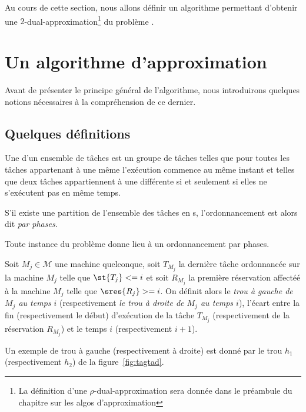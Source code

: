 \documentclass[a4paper,9pt]{article}
\begin{document}
Au cours de cette section, nous allons définir un algorithme permettant d'obtenir une
$2$-dual-approximation\footnote{La définition d'une $\rho$-dual-approximation sera donnée dans le
préambule du chapitre sur les algos d'approximation} du problème \unitfisched{}. 

\section{Un algorithme d'approximation}

Avant de présenter le principe général de l'algorithme, nous introduirons quelques notions
nécessaires à la compréhension de ce dernier.

\subsection{Quelques définitions}

\begin{ndf}
    Une \tphase{} d'un ensemble de tâches est un groupe de tâches telles que pour toutes les tâches
    appartenant à une même \tphase{} l'exécution commence au même instant et telles que deux tâches
    appartiennent à une \tphase{} différente si et seulement si elles ne s'exécutent pas en même
    temps.

    S'il existe une partition de l'ensemble des tâches en \tphase{}s, l'ordonnancement est alors dit
    \emph{par phases}.
\end{ndf}

\begin{nprop}
    Toute instance du problème \unitfisched{} donne lieu à un ordonnancement par phases.
\end{nprop}


\begin{ndf}
    Soit $M_j \in \mathcal{M}$ une machine quelconque, soit $T_{M_j}$ la dernière tâche ordonnancée
    sur la machine $M_j$ telle que $\st{T_j} <= i$ et soit $R_{M_j}$ la première réservation
    affectéé à la machine $M_j$ telle que $\sres{R_j} >= i$. On définit alors le \emph{trou à gauche
    de $M_j$ au temps $i$} (respectivement \emph{le trou à droite de $M_j$ au temps $i$}), l'écart
    entre la fin (respectivement le début) d'exécution de la tâche $T_{M_j}$ (respectivement de la
    réservation $R_{M_j}$) et le temps $i$ (respectivement $i+1$).

    Un exemple de trou à gauche (respectivement à droite) est donné par le trou $h_1$
    (respectivement $h_2$) de la figure~\ref{fig:tagtad}.
\end{ndf}
\end{document}
